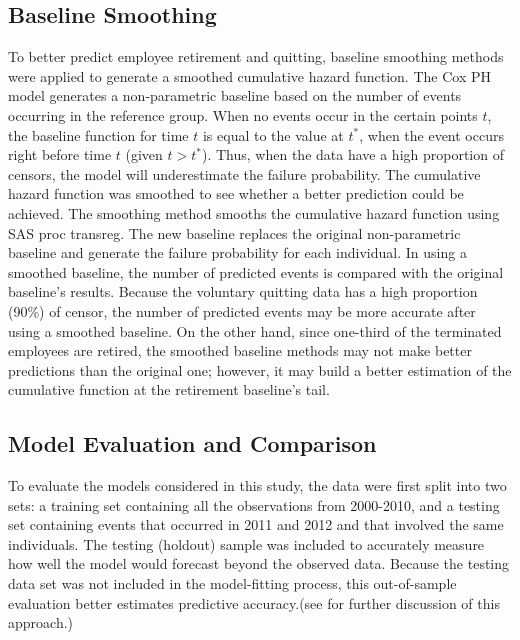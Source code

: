 \subsection{Baseline Smoothing}
To better predict employee retirement and quitting, baseline smoothing methods were applied to generate a smoothed cumulative hazard function. The Cox PH model generates a non-parametric baseline based on the number of events occurring in the reference group. When no events occur in the certain points $t$, the baseline function for time $t$ is equal to the value at $t^*$, when the event occurs right before time $t$ (given $t>t^*$). Thus, when the data have a high proportion of censors, the model will underestimate the failure probability. The cumulative hazard function was smoothed to see whether a better prediction could be achieved. The smoothing method smooths the cumulative hazard function using SAS proc transreg. The new baseline replaces the original non-parametric baseline and generate the failure probability for each individual. In using a smoothed baseline, the number of predicted events is compared with the original baseline's results. Because the voluntary quitting data has a high proportion (90\%) of censor, the number of predicted events may be more accurate after using a smoothed baseline. On the other hand, since one-third of the terminated employees are retired, the smoothed baseline methods may not make better predictions than the original one; however, it may build a better estimation of the cumulative function at the retirement baseline's tail.       

\subsection{Model Evaluation and Comparison}

To evaluate the models considered in this study, the data were first split into two sets: a training set containing all the observations from 2000-2010, and a testing set containing events that occurred in 2011 and 2012 and that involved the same individuals. The testing (holdout) sample was included to accurately measure how well the model would forecast beyond the observed data. Because the testing data set was not included in the model-fitting process, this out-of-sample evaluation better estimates predictive accuracy.(see \citet{kuhn2013} for further discussion of this approach.)


